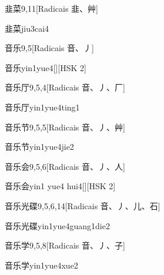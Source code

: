 \begin{entry}{韭菜}{9,11}[Radicais ⾲、⾋]
  \begin{phonetics}{韭菜}{jiu3cai4}
  \end{phonetics}
\end{entry}

\begin{entry}{音乐}{9,5}[Radicais ⾳、⼃]
  \begin{phonetics}{音乐}{yin1yue4}[][HSK 2]
  \end{phonetics}
\end{entry}

\begin{entry}{音乐厅}{9,5,4}[Radicais ⾳、⼃、⼚]
  \begin{phonetics}{音乐厅}{yin1yue4ting1}
  \end{phonetics}
\end{entry}

\begin{entry}{音乐节}{9,5,5}[Radicais ⾳、⼃、⾋]
  \begin{phonetics}{音乐节}{yin1yue4jie2}
  \end{phonetics}
\end{entry}

\begin{entry}{音乐会}{9,5,6}[Radicais ⾳、⼃、⼈]
  \begin{phonetics}{音乐会}{yin1 yue4 hui4}[][HSK 2]
  \end{phonetics}
\end{entry}

\begin{entry}{音乐光碟}{9,5,6,14}[Radicais ⾳、⼃、⼉、⽯]
  \begin{phonetics}{音乐光碟}{yin1yue4guang1die2}
  \end{phonetics}
\end{entry}

\begin{entry}{音乐学}{9,5,8}[Radicais ⾳、⼃、⼦]
  \begin{phonetics}{音乐学}{yin1yue4xue2}
  \end{phonetics}
\end{entry}

